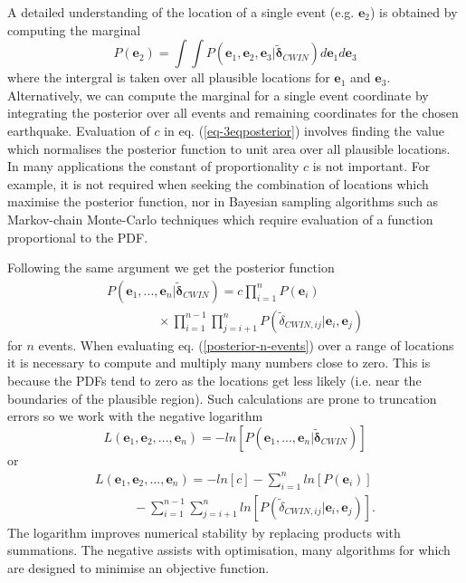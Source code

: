 \documentclass[extra]{gji}
\begin{document}
A detailed understanding of the location of a single event (e.g. $\mathbf{e}_2$) is obtained by computing the
marginal
\begin{equation}
\label{eq:-E2-marginal}
P(\mathbf{e}_2) = \int \int P(\mathbf{e}_1, \mathbf{e}_2, \mathbf{e}_3 | \widetilde{\mathbf{\delta}}_{CWIN}) d\mathbf{e}_1 d\mathbf{e}_3
\end{equation}
where the intergral is taken over all plausible locations for $\mathbf{e}_1$ and $\mathbf{e}_3$.
Alternatively, we can compute the marginal for a single event coordinate
by integrating the posterior over all events and remaining coordinates
for the chosen earthquake. Evaluation of $c$ in eq. (\ref{eq-3eqposterior}) involves finding the value which
normalises the posterior function to unit area over all plausible locations.
In many applications the constant of
proportionality $c$ is not important. For example, it is not required
when seeking the combination of locations which maximise
 the posterior function, nor in Bayesian sampling algorithms such as Markov-chain Monte-Carlo
techniques which require evaluation of a function proportional to the PDF.

Following the same argument we get the posterior function
\begin{equation}
\begin{array}{l}
\label{posterior-n-events}
P(\mathbf{e}_1,...,\mathbf{e}_n | \widetilde{\mathbf{\delta}}_{CWIN}) = c \displaystyle \prod_{i=1}^n P(\mathbf{e}_i) \\
\hspace{4em} \displaystyle  \times \prod_{i=1}^{n-1} \prod_{j=i+1}^n P(\widetilde{\delta}_{CWIN,ij}|\mathbf{e}_i,\mathbf{e}_j)
\end{array}
\end{equation}
for $n$ events. When evaluating eq. (\ref{posterior-n-events}) over a range of locations
it is necessary to compute and multiply many numbers close to zero.
This is because the PDFs tend to zero as
the locations get less likely (i.e. near the boundaries of the plausible region).
Such calculations are prone to truncation errors so we
work with the negative logarithm
\begin{equation}
\label{eq:-negative-log-part1}
L(\mathbf{e}_1, \mathbf{e}_2, ..., \mathbf{e}_n) = -ln\left[ P(\mathbf{e}_1,...,\mathbf{e}_n | \widetilde{\mathbf{\delta}}_{CWIN} )  \right]
\end{equation}
or
\begin{equation}
\begin{array}{l}
\label{eq:-negative-log}
L(\mathbf{e}_1, \mathbf{e}_2, ..., \mathbf{e}_n) =
-ln\left[ c \right] - \displaystyle \sum_{i=1}^n ln\left[P(\mathbf{e}_i)\right] \\
\hspace{3em} - \displaystyle \sum_{i=1}^{n-1} \sum_{j=i+1}^n ln\left[P(\widetilde{\delta}_{CWIN,ij}|\mathbf{e}_i,\mathbf{e}_j)\right].
\end{array}
\end{equation}
The logarithm improves numerical stability by replacing products with summations. The negative assists with
optimisation, many algorithms for which are designed to minimise an objective function.
\end{document}
